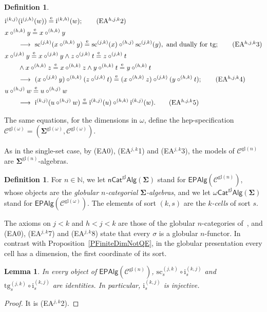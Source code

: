 \documentclass[a4paper,reqno]{amsart}
\newcommand{\sig}[1]{\mathbf{#1}}                %
\newcommand{\spec}[1]{\boldsymbol{\mathcal{#1}}} %
\newcommand{\eeq}{\overset{\mathrm e}{=}}        %
\newcommand{\gl}{\mathrm{gl}}
\newcommand{\src}{\mathrm{sc}}
\newcommand{\tgt}{\mathrm{tg}}
\newcommand{\ii}{\mathrm{i}}
\newcommand{\EPAlg}{\mathsf{EPAlg}}
\theoremstyle{plain}
\newtheorem{lemma}[theorem]{Lemma}
\theoremstyle{definition}
\newtheorem{definition}[theorem]{Definition}
\begin{document}
\begin{definition}
\begin{align*}
&\ii^{(k,j)}(\ii^{(j,h)}(w))\eeq\ii^{(k,h)}(w);
\tag{EA$^{h,j,k}$2}\\
&x\circ^{(h,k)}y\eeq x\circ^{(h,k)}y
\\&\qquad\longrightarrow\ \src^{(j,k)}(x\circ^{(h,k)}y)\eeq\src^{(j,k)}(x)\circ^{(h,j)}\src^{(j,k)}(y),\ \text{and dually for $\tgt$};
\tag{EA$^{h,j,k}$3}\\
&x\circ^{(j,k)}y\eeq x\circ^{(j,k)}y\wedge z\circ^{(j,k)}t\eeq z\circ^{(j,k)}t
\\&\qquad\wedge x\circ^{(h,k)}z\eeq x\circ^{(h,k)}z\wedge y\circ^{(h,k)}t\eeq y\circ^{(h,k)}t
\\&\qquad\longrightarrow\ (x\circ^{(j,k)}y)\circ^{(h,k)}(z\circ^{(j,k)}t)\eeq(x\circ^{(h,k)}z)\circ^{(j,k)}(y\circ^{(h,k)}t);
\tag{EA$^{h,j,k}$4}\\
&u\circ^{(h,j)}w\eeq u\circ^{(h,j)}w
\\&\qquad\longrightarrow\ \ii^{(k,j)}(u\circ^{(h,j)}w)\eeq\ii^{(k,j)}(u)\circ^{(h,k)}\ii^{(k,j)}(w).
\tag{EA$^{h,j,k}$5}
\end{align*}
\end{definition}

The same equations, for the dimensions in $\omega$, define the hep-specification $\spec{C}^{\gl(\omega)}=(\sig{\Sigma}^{\gl(\omega)},\mathcal{C}^{\gl(\omega)})$.

As in the single-set case, by (EA0), (EA$^{j,k}$1) and (EA$^{j,k}$3), the models of $\mathcal{C}^{\gl(n)}$ are $\sig{\Sigma}^{\gl(n)}$-algebras.

\begin{definition}\label{DGlCatAlg}
For $n\in\mathbb{N}$, we let $\mathsf{nCat}^{\gl}\mathsf{Alg}(\sig{\Sigma})$ stand for $\EPAlg(\spec{C}^{\gl(n)})$, whose objects are the \emph{globular $n$-categorial $\sig{\Sigma}$-algebras}, and we let $\omega\mathsf{Cat}^{\gl}\mathsf{Alg}(\sig{\Sigma})$ stand for $\EPAlg(\spec{C}^{\gl(\omega)})$.
The elements of sort $(k,s)$ are the \emph{$k$-cells} of sort $s$.
\end{definition}

The axioms on $j<k$ and $h<j<k$ are those of the globular $n$-categories of~\cite{abgmmm23}, and (EA0), (EA$^{j,k}$7) and (EA$^{j,k}$8) state that every $\sigma$ is a globular $n$-functor.
In contrast with Proposition~\ref{PFiniteDimNotQE}, in the globular presentation every cell has a dimension, the first coordinate of its sort.

\begin{lemma}\label{LUnifInj}
In every object of $\EPAlg(\spec{C}^{\gl(n)})$, $\src^{(j,k)}_{s}\circ\ii^{(k,j)}_{s}$ and $\tgt^{(j,k)}_{s}\circ\ii^{(k,j)}_{s}$ are identities.
In particular, $\ii^{(k,j)}_{s}$ is injective.
\end{lemma}
\begin{proof}
It is (EA$^{j,k}$2).
\end{proof}
\end{document}

